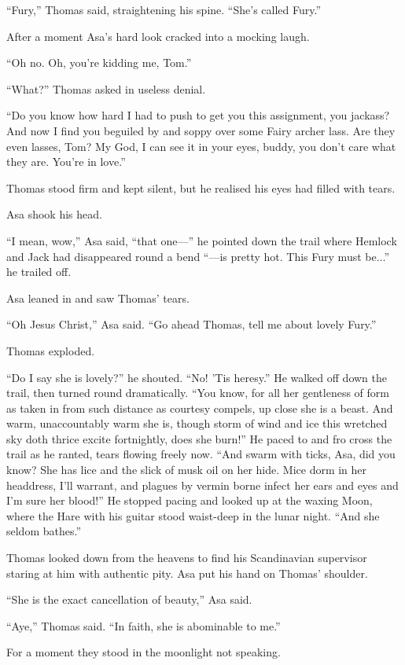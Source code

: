 \documentclass[11pt,a5paper]{article}
\begin{document}
``Fury,'' Thomas said, straightening his spine. ``She's called Fury.''

After a moment Asa's hard look cracked into a mocking laugh.

``Oh no. Oh, you're kidding me, Tom.''

``What?'' Thomas asked in useless denial.

``Do you know how hard I had to push to get you this assignment, you jackass? And now I find you beguiled by and soppy over some Fairy archer lass. Are they even lasses, Tom? My God, I can see it in your eyes, buddy, you don't care what they are. You're in love.''

Thomas stood firm and kept silent, but he realised his eyes had filled with tears.

Asa shook his head.

``I mean, wow,'' Asa said, ``that one---'' he pointed down the trail where Hemlock and Jack had disappeared round a bend ``---is pretty hot. This Fury must be...'' he trailed off.

Asa leaned in and saw Thomas' tears.

``Oh Jesus Christ,'' Asa said. ``Go ahead Thomas, tell me about lovely Fury.''

Thomas exploded.

``Do I say she is lovely?'' he shouted. ``No! 'Tis heresy.'' He walked off down the trail, then turned round dramatically. ``You know, for all her gentleness of form as taken in from such distance as courtesy compels, up close she is a beast. And warm, unaccountably warm she is, though storm of wind and ice this wretched sky doth thrice excite fortnightly, does she burn!'' He paced to and fro cross the trail as he ranted, tears flowing freely now. ``And swarm with ticks, Asa, did you know? She has lice and the slick of musk oil on her hide. Mice dorm in her headdress, I'll warrant, and plagues by vermin borne infect her ears and eyes and I'm sure her blood!'' He stopped pacing and looked up at the waxing Moon, where the Hare with his guitar stood waist-deep in the lunar night. ``And she seldom bathes.''

Thomas looked down from the heavens to find his Scandinavian supervisor staring at him with authentic pity. Asa put his hand on Thomas' shoulder.

``She is the exact cancellation of beauty,'' Asa said.

``Aye,'' Thomas said. ``In faith, she is abominable to me.''

For a moment they stood in the moonlight not speaking.
\end{document}
